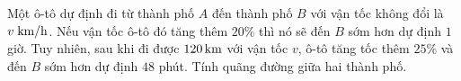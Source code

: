 \begin{ex}%
	Một ô-tô dự định đi từ thành phố $A$ đến thành phố $B$ với vận tốc không đổi là $v \text{\;km}/\text{h}$. Nếu vận tốc ô-tô đó tăng thêm $20\%$ thì nó sẽ đến $B$ sớm hơn dự định $1$ giờ. Tuy nhiên, sau khi đi được $120 \text{\,km}$ với vận tốc $v$, ô-tô tăng tốc thêm $25\%$ và đến $B$ sớm hơn dự định $48$ phút. Tính quãng đường giữa hai thành phố.
\end{ex}

